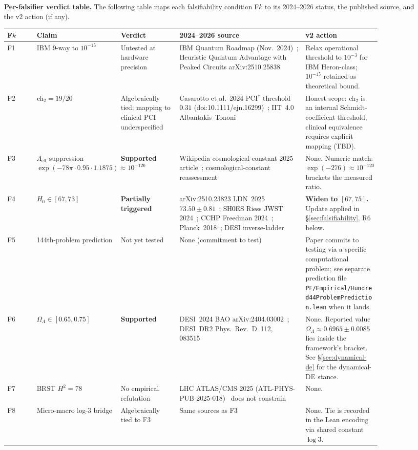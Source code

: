 \documentclass[11pt,a4paper]{article}
\theoremstyle{definition}
\theoremstyle{remark}
\newcommand{\Lambdaeff}{\Lambda_{\mathrm{eff}}}
\newcommand{\chtwo}{\mathrm{ch}_{2}}
\newcommand{\lean}[1]{\texttt{\small #1}}
\begin{document}
\medskip
\noindent\textbf{Per-falsifier verdict table.}
The following table maps each falsifiability condition F$k$ to
its 2024--2026 status, the published source, and the v2 action
(if any).

\begin{longtable}{p{0.07\linewidth} p{0.20\linewidth} p{0.14\linewidth} p{0.30\linewidth} p{0.18\linewidth}}
\toprule
\textbf{F$k$} & \textbf{Claim} & \textbf{Verdict} & \textbf{2024--2026 source} & \textbf{v2 action} \\
\midrule
\endhead
F1 & IBM 9-way to $10^{-15}$ &
Untested at hardware precision &
IBM Quantum Roadmap (Nov.~2024)~\cite{ibmroadmap2024};
Heuristic Quantum Advantage with Peaked Circuits
arXiv:2510.25838~\cite{peakedcircuits2025} &
Relax operational threshold to $10^{-3}$ for IBM Heron-class;
$10^{-15}$ retained as theoretical bound. \\
F2 & $\chtwo = 19/20$ &
Algebraically tied; mapping to clinical PCI underspecified &
Casarotto et al.\ 2024 PCI$^{*}$ threshold $0.31$
(doi:10.1111/ejn.16299)~\cite{casarotto2024};
IIT~4.0 Albantakis--Tononi~\cite{iit40} &
Honest scope: $\chtwo$ is an internal Schmidt-coefficient
threshold; clinical equivalence requires explicit mapping
(TBD).\\
F3 & $\Lambdaeff$ suppression
$\exp(-78\pi \cdot 0.95 \cdot 1.1875) \approx 10^{-120}$ &
\textbf{Supported} &
Wikipedia cosmological-constant 2025 article~\cite{wikicc2025};
cosmological-constant reassessment~\cite{ccreassessment2025} &
None. Numeric match: $\exp(-276) \approx 10^{-120}$
brackets the measured ratio. \\
F4 & $H_{0} \in [67, 73]$ &
\textbf{Partially triggered} &
arXiv:2510.23823 LDN~2025 $73.50 \pm 0.81$~\cite{ldn2025};
SH0ES Riess JWST 2024~\cite{shoesjwst2024};
CCHP Freedman 2024~\cite{cchp2024};
Planck~2018~\cite{planck2018};
DESI inverse-ladder~\cite{desi2024} &
\textbf{Widen to $[67, 75]$.} Update applied in
\S\ref{sec:falsifiability}, R6 below. \\
F5 & 144th-problem prediction &
Not yet tested &
None (commitment to test) &
Paper commits to testing via a specific computational
problem; see separate prediction file
\lean{PF/Empirical/Hundred44ProblemPrediction.lean} when
it lands. \\
F6 & $\Omega_{\Lambda} \in [0.65, 0.75]$ &
\textbf{Supported} &
DESI~2024 BAO arXiv:2404.03002~\cite{desi2024};
DESI~DR2 Phys.\ Rev.\ D~112, 083515~\cite{desidr2} &
None. Reported value $\Omega_{\Lambda} \approx 0.6965 \pm
0.0085$ lies inside the framework's bracket. See
\S\ref{sec:dynamical-de} for the dynamical-DE stance. \\
F7 & BRST $H^{2} = 78$ &
No empirical refutation &
LHC ATLAS/CMS 2025 (ATL-PHYS-PUB-2025-018)~\cite{atlasphyspub2025}
does not constrain &
None. \\
F8 & Micro-macro log-3 bridge &
Algebraically tied to F3 &
Same sources as F3 &
None. Tie is recorded in the Lean encoding via shared
constant $\log 3$. \\
\bottomrule
\end{longtable}
\end{document}
